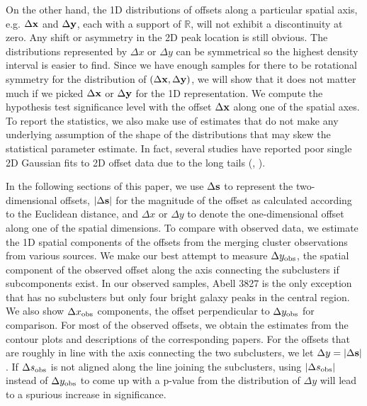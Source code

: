 On the other hand, 
the 1D distributions of offsets along a particular spatial axis, 
e.g. $\Delta {\bf x}$ and $\Delta {\bf y}$,
each with a support of $\mathbb{R}$, will not exhibit a discontinuity at zero.
Any shift or asymmetry in the 2D peak location is still obvious. 
The distributions represented by $\Delta x$ or $\Delta y$ 
can be symmetrical so 
the highest density interval is easier to find.
Since we have enough samples for there to be
rotational symmetry for the distribution of $(\Delta {\bf x}, \Delta {\bf y})$,
we will show that it does not
matter much if we picked $\Delta {\bf x}$ or $\Delta {\bf y}$ for the 1D representation.
We compute the hypothesis test significance level with the 
 offset $\Delta {\bf x}$ along one of the spatial axes. 
To report the statistics, we also make use of estimates that do not make any
underlying assumption of the shape of the distributions that may skew the
statistical parameter estimate.
In fact, several studies have reported poor single 2D Gaussian fits to 2D offset data
due to the long tails
(\citealt{Zitrin2012a}, \citealt{Oguri2010}).  

In the following sections of this paper, we use $\Delta {\bf s}$  to represent the
two-dimensional offsets, $|\Delta {\bf s}|$ for the magnitude of the offset as calculated
according to the Euclidean distance, and $\Delta x$ or $\Delta y$ to denote the
one-dimensional offset along one of the spatial dimensions.
To compare with observed data, we estimate the 1D spatial components of
the offsets from the merging cluster observations from various sources.   
We make our best attempt to measure $\Delta y_{\rm obs}$, the spatial component of the
observed offset along the axis connecting the subclusters if subcomponents exist. 
In our observed samples, Abell 3827 is the only exception that has no
subclusters but only four bright galaxy peaks in the central region. 
We also show $\Delta x_{\rm obs}$ components, the offset perpendicular to
$\Delta y_{\rm obs}$ for comparison.
For most of the observed offsets, we obtain the estimates from the contour plots 
and descriptions of the corresponding papers. 
For the offsets that are roughly in line with the axis connecting the two subclusters,
we let $\Delta y = |\Delta {\bf s}|$. 
If $\Delta s_{\rm obs}$ is not aligned along the line joining the subclusters,
using $|\Delta s_{\rm obs}|$ instead of $\Delta y_{\rm obs}$ to come 
up with a p-value from the distribution of 
$\Delta y$ will lead to a spurious increase in significance.


 
